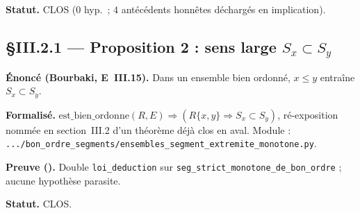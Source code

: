 \textbf{Statut.} CLOS ($0$ hyp.\ ; $4$ antécédents honnêtes déchargés en implication).

\subsection{§III.2.1 --- Proposition 2 : sens large $S_x\subset S_y$}
\textbf{Énoncé (Bourbaki, E~III.15).} Dans un ensemble bien ordonné, $x\leq y$
entraîne $S_x\subset S_y$.

\textbf{Formalisé.} $\mathrm{est\_bien\_ordonne}(R,E)\Rightarrow(R\{x,y\}\Rightarrow S_x\subset S_y)$,
ré-exposition nommée en section~III.2 d'un théorème déjà clos en aval. Module :
\texttt{.../bon\_ordre\_segments/ensembles\_segment\_extremite\_monotone.py}.

\textbf{Preuve (\Nstar).} Double \texttt{loi\_deduction} sur
\texttt{seg\_strict\_monotone\_de\_bon\_ordre} ; aucune hypothèse parasite.

\textbf{Statut.} CLOS.
